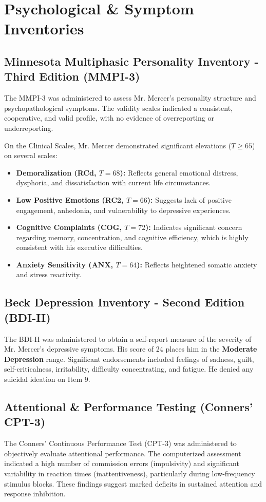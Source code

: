 \section{Psychological \& Symptom Inventories}

\subsection{Minnesota Multiphasic Personality Inventory - Third Edition (MMPI-3)}
The MMPI-3 was administered to assess Mr. Mercer's personality structure and psychopathological symptoms. The validity scales indicated a consistent, cooperative, and valid profile, with no evidence of overreporting or underreporting.

On the Clinical Scales, Mr. Mercer demonstrated significant elevations ($T \ge 65$) on several scales:
\begin{itemize}
    \item \textbf{Demoralization (RCd, $T = 68$):} Reflects general emotional distress, dysphoria, and dissatisfaction with current life circumstances.
    \item \textbf{Low Positive Emotions (RC2, $T = 66$):} Suggests lack of positive engagement, anhedonia, and vulnerability to depressive experiences.
    \item \textbf{Cognitive Complaints (COG, $T = 72$):} Indicates significant concern regarding memory, concentration, and cognitive efficiency, which is highly consistent with his executive difficulties.
    \item \textbf{Anxiety Sensitivity (ANX, $T = 64$):} Reflects heightened somatic anxiety and stress reactivity.
\end{itemize}

\subsection{Beck Depression Inventory - Second Edition (BDI-II)}
The BDI-II was administered to obtain a self-report measure of the severity of Mr. Mercer's depressive symptoms. His score of 24 places him in the \textbf{Moderate Depression} range. Significant endorsements included feelings of sadness, guilt, self-criticalness, irritability, difficulty concentrating, and fatigue. He denied any suicidal ideation on Item 9.

\subsection{Attentional \& Performance Testing (Conners' CPT-3)}
The Conners' Continuous Performance Test (CPT-3) was administered to objectively evaluate attentional performance. The computerized assessment indicated a high number of commission errors (impulsivity) and significant variability in reaction times (inattentiveness), particularly during low-frequency stimulus blocks. These findings suggest marked deficits in sustained attention and response inhibition.
